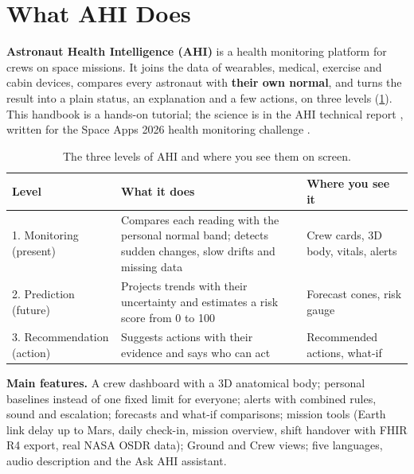 \section{What AHI Does}
\label{sec:what-is-ahi}

\textbf{Astronaut Health Intelligence (AHI)} is a health monitoring platform for crews on space missions. It joins the data of wearables, medical, exercise and cabin devices, compares every astronaut with \textbf{their own normal}, and turns the result into a plain status, an explanation and a few actions, on three levels (\ref{tab:levels}). This handbook is a hands-on tutorial; the science is in the AHI technical report \cite{ahi_tech_report}, written for the Space Apps 2026 health monitoring challenge \cite{nasa_health_monitoring_challenge_2026}.

\begin{table}[H]
\centering
\caption{The three levels of AHI and where you see them on screen.}
\label{tab:levels}
\footnotesize
\begin{tabular}{p{3.4cm}p{7.6cm}p{5.4cm}}
\hline
\textbf{Level} & \textbf{What it does} & \textbf{Where you see it} \\
\hline
1. Monitoring (present) & Compares each reading with the personal normal band; detects sudden changes, slow drifts and missing data & Crew cards, 3D body, vitals, alerts \\
2. Prediction (future) & Projects trends with their uncertainty and estimates a risk score from 0 to 100 & Forecast cones, risk gauge \\
3. Recommendation (action) & Suggests actions with their evidence and says who can act & Recommended actions, what-if \\
\hline
\end{tabular}
\end{table}

\noindent\textbf{Main features.} A crew dashboard with a 3D anatomical body; personal baselines instead of one fixed limit for everyone; alerts with combined rules, sound and escalation; forecasts and what-if comparisons; mission tools (Earth link delay up to Mars, daily check-in, mission overview, shift handover with FHIR R4 export, real NASA OSDR data); Ground and Crew views; five languages, audio description and the Ask AHI assistant.


